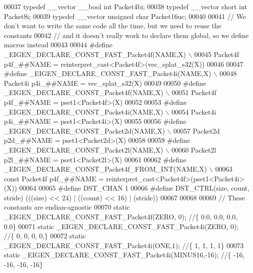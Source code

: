 \begin{DoxyCode}
00037 \textcolor{keyword}{typedef} \_\_vector \_\_bool \textcolor{keywordtype}{int}     Packet4bi;
00038 \textcolor{keyword}{typedef} \_\_vector \textcolor{keywordtype}{short} \textcolor{keywordtype}{int}      Packet8i;
00039 \textcolor{keyword}{typedef} \_\_vector \textcolor{keywordtype}{unsigned} \textcolor{keywordtype}{char}  Packet16uc;
00040 
00041 \textcolor{comment}{// We don't want to write the same code all the time, but we need to reuse the constants}
00042 \textcolor{comment}{// and it doesn't really work to declare them global, so we define macros instead}
00043 
00044 \textcolor{preprocessor}{#define \_EIGEN\_DECLARE\_CONST\_FAST\_Packet4f(NAME,X) \(\backslash\)}
00045 \textcolor{preprocessor}{  Packet4f p4f\_##NAME = reinterpret\_cast<Packet4f>(vec\_splat\_s32(X))}
00046 
00047 \textcolor{preprocessor}{#define \_EIGEN\_DECLARE\_CONST\_FAST\_Packet4i(NAME,X) \(\backslash\)}
00048 \textcolor{preprocessor}{  Packet4i p4i\_##NAME = vec\_splat\_s32(X)}
00049 
00050 \textcolor{preprocessor}{#define \_EIGEN\_DECLARE\_CONST\_Packet4f(NAME,X) \(\backslash\)}
00051 \textcolor{preprocessor}{  Packet4f p4f\_##NAME = pset1<Packet4f>(X)}
00052 
00053 \textcolor{preprocessor}{#define \_EIGEN\_DECLARE\_CONST\_Packet4i(NAME,X) \(\backslash\)}
00054 \textcolor{preprocessor}{  Packet4i p4i\_##NAME = pset1<Packet4i>(X)}
00055 
00056 \textcolor{preprocessor}{#define \_EIGEN\_DECLARE\_CONST\_Packet2d(NAME,X) \(\backslash\)}
00057 \textcolor{preprocessor}{  Packet2d p2d\_##NAME = pset1<Packet2d>(X)}
00058 
00059 \textcolor{preprocessor}{#define \_EIGEN\_DECLARE\_CONST\_Packet2l(NAME,X) \(\backslash\)}
00060 \textcolor{preprocessor}{  Packet2l p2l\_##NAME = pset1<Packet2l>(X)}
00061 
00062 \textcolor{preprocessor}{#define \_EIGEN\_DECLARE\_CONST\_Packet4f\_FROM\_INT(NAME,X) \(\backslash\)}
00063 \textcolor{preprocessor}{  const Packet4f p4f\_##NAME = reinterpret\_cast<Packet4f>(pset1<Packet4i>(X))}
00064 
00065 \textcolor{preprocessor}{#define DST\_CHAN 1}
00066 \textcolor{preprocessor}{#define DST\_CTRL(size, count, stride) (((size) << 24) | ((count) << 16) | (stride))}
00067 
00068 
00069 \textcolor{comment}{// These constants are endian-agnostic}
00070 \textcolor{keyword}{static} \_EIGEN\_DECLARE\_CONST\_FAST\_Packet4f(ZERO, 0); \textcolor{comment}{//\{ 0.0, 0.0, 0.0, 0.0\}}
00071 \textcolor{keyword}{static} \_EIGEN\_DECLARE\_CONST\_FAST\_Packet4i(ZERO, 0); \textcolor{comment}{//\{ 0, 0, 0, 0,\}}
00072 \textcolor{keyword}{static} \_EIGEN\_DECLARE\_CONST\_FAST\_Packet4i(ONE,1); \textcolor{comment}{//\{ 1, 1, 1, 1\}}
00073 \textcolor{keyword}{static} \_EIGEN\_DECLARE\_CONST\_FAST\_Packet4i(MINUS16,-16); \textcolor{comment}{//\{ -16, -16, -16, -16\}}

\end{DoxyCode}
